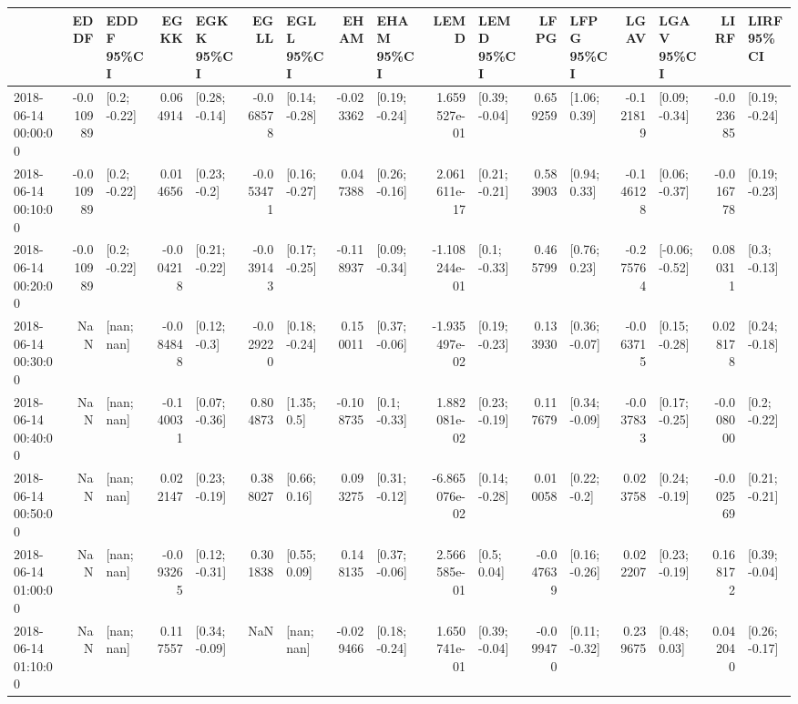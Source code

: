 \begin{tabular}{lrlrlrlrlrlrlrlrl}
\toprule
{} &      EDDF &      EDDF 95\%CI &      EGKK &      EGKK 95\%CI &      EGLL &      EGLL 95\%CI &      EHAM &      EHAM 95\%CI &          LEMD &      LEMD 95\%CI &      LFPG &      LFPG 95\%CI &      LGAV &      LGAV 95\%CI &      LIRF &      LIRF 95\%CI \\
\midrule
2018-06-14 00:00:00 & -0.010989 &    [0.2; -0.22] &  0.064914 &   [0.28; -0.14] & -0.068578 &   [0.14; -0.28] & -0.023362 &   [0.19; -0.24] &  1.659527e-01 &   [0.39; -0.04] &  0.659259 &    [1.06; 0.39] & -0.121819 &   [0.09; -0.34] & -0.023685 &   [0.19; -0.24] \\
2018-06-14 00:10:00 & -0.010989 &    [0.2; -0.22] &  0.014656 &    [0.23; -0.2] & -0.053471 &   [0.16; -0.27] &  0.047388 &   [0.26; -0.16] &  2.061611e-17 &   [0.21; -0.21] &  0.583903 &    [0.94; 0.33] & -0.146128 &   [0.06; -0.37] & -0.016778 &   [0.19; -0.23] \\
2018-06-14 00:20:00 & -0.010989 &    [0.2; -0.22] & -0.004218 &   [0.21; -0.22] & -0.039143 &   [0.17; -0.25] & -0.118937 &   [0.09; -0.34] & -1.108244e-01 &    [0.1; -0.33] &  0.465799 &    [0.76; 0.23] & -0.275764 &  [-0.06; -0.52] &  0.080311 &    [0.3; -0.13] \\
2018-06-14 00:30:00 &       NaN &      [nan; nan] & -0.084848 &    [0.12; -0.3] & -0.029220 &   [0.18; -0.24] &  0.150011 &   [0.37; -0.06] & -1.935497e-02 &   [0.19; -0.23] &  0.133930 &   [0.36; -0.07] & -0.063715 &   [0.15; -0.28] &  0.028178 &   [0.24; -0.18] \\
2018-06-14 00:40:00 &       NaN &      [nan; nan] & -0.140031 &   [0.07; -0.36] &  0.804873 &     [1.35; 0.5] & -0.108735 &    [0.1; -0.33] &  1.882081e-02 &   [0.23; -0.19] &  0.117679 &   [0.34; -0.09] & -0.037833 &   [0.17; -0.25] & -0.008000 &    [0.2; -0.22] \\
2018-06-14 00:50:00 &       NaN &      [nan; nan] &  0.022147 &   [0.23; -0.19] &  0.388027 &    [0.66; 0.16] &  0.093275 &   [0.31; -0.12] & -6.865076e-02 &   [0.14; -0.28] &  0.010058 &    [0.22; -0.2] &  0.023758 &   [0.24; -0.19] & -0.002569 &   [0.21; -0.21] \\
2018-06-14 01:00:00 &       NaN &      [nan; nan] & -0.093265 &   [0.12; -0.31] &  0.301838 &    [0.55; 0.09] &  0.148135 &   [0.37; -0.06] &  2.566585e-01 &     [0.5; 0.04] & -0.047639 &   [0.16; -0.26] &  0.022207 &   [0.23; -0.19] &  0.168172 &   [0.39; -0.04] \\
2018-06-14 01:10:00 &       NaN &      [nan; nan] &  0.117557 &   [0.34; -0.09] &       NaN &      [nan; nan] & -0.029466 &   [0.18; -0.24] &  1.650741e-01 &   [0.39; -0.04] & -0.099470 &   [0.11; -0.32] &  0.239675 &    [0.48; 0.03] &  0.042040 &   [0.26; -0.17] \\

\end{tabular}
